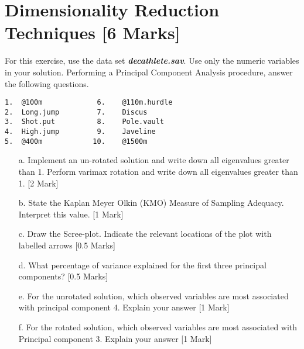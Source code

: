 \documentclass[12pt, a4paper]{article}
\theoremstyle{plain}
\theoremstyle{definition}
\theoremstyle{remark}
\begin{document}
\newpage
\section{Dimensionality Reduction Techniques [6 Marks]}  %

For this exercise, use the data set \textbf{\textit{decathlete.sav}}. Use only the numeric variables in your solution.
Performing a Principal Component Analysis procedure, answer the following questions.
\begin{verbatim}
1.	@100m             6.	@110m.hurdle
2.	Long.jump         7.	Discus
3.	Shot.put          8.	Pole.vault
4.	High.jump         9.	Javeline
5.	@400m            10.	@1500m
\end{verbatim}






\begin{itemize}
\item[a.] Implement an un-rotated solution and write down all eigenvalues greater than 1. Perform varimax rotation and write down all eigenvalues greater than 1. [2 Mark]
\item[b.] State the Kaplan Meyer Olkin (KMO) Measure of Sampling Adequacy. Interpret this value. [1 Mark]
\item[c.] Draw the Scree-plot. Indicate the relevant locations of the plot with labelled arrows [0.5 Marks]
\item[d.] What percentage of variance explained for the first three principal components? [0.5 Marks] %
\item[e.] For the unrotated solution, which observed variables are most associated with principal component 4.  Explain your answer [1 Mark]
\item[f.] For the rotated solution, which observed variables are most associated with Principal component 3.  Explain your answer [1 Mark]
\end{itemize}
\end{document}
